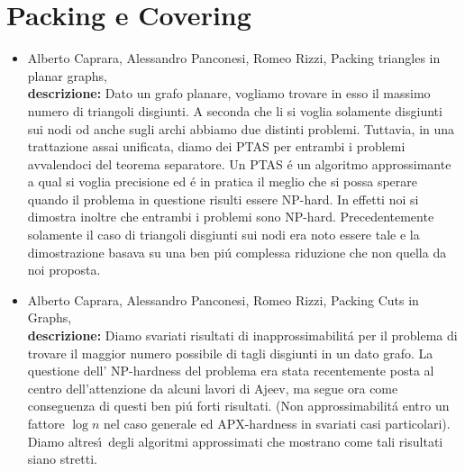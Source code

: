 \documentclass[10pt]{article}
\begin{document}
\section{Packing e Covering}

\begin{itemize}
  \vspace{1.4mm}
  \item[] {\sc Alberto Caprara, Alessandro Panconesi, Romeo Rizzi},
   \newblock  Packing triangles in planar graphs,
   \\
{\bf descrizione:}
Dato un grafo planare,
vogliamo trovare in esso il massimo numero di triangoli disgiunti.
A seconda che li si voglia solamente disgiunti sui nodi od
anche sugli archi abbiamo due distinti problemi.
Tuttavia, in una trattazione assai unificata,
diamo dei PTAS per entrambi i problemi
avvalendoci del teorema separatore.
Un PTAS \'e un algoritmo approssimante
a qual si voglia precisione
ed \'e in pratica il meglio che si possa sperare
quando il problema in questione
risulti essere NP-hard.
In effetti noi si dimostra inoltre che entrambi i problemi sono
NP-hard.
Precedentemente solamente il caso di triangoli disgiunti
sui nodi era noto essere tale e la dimostrazione
basava su una ben pi\'u complessa riduzione
che non quella da noi proposta.\\

  \vspace{1.4mm}
  \item[] {\sc Alberto Caprara, Alessandro Panconesi, Romeo Rizzi},
   \newblock  Packing Cuts in Graphs,
   \\
{\bf descrizione:}
Diamo svariati risultati di inapprossimabilit\'a
per il problema di trovare il maggior numero possibile di
tagli disgiunti in un dato grafo.
La questione dell' NP-hardness del problema
era stata recentemente posta al centro dell'attenzione
da alcuni lavori di Ajeev,
ma segue ora come conseguenza di questi ben pi\'u forti risultati.
(Non approssimabilit\'a entro un fattore $\log n$ nel caso generale
ed APX-hardness in svariati casi particolari).
Diamo altres\'\i\ degli algoritmi approssimati che mostrano
come tali risultati siano stretti.\\


\end{itemize}
\end{document}
